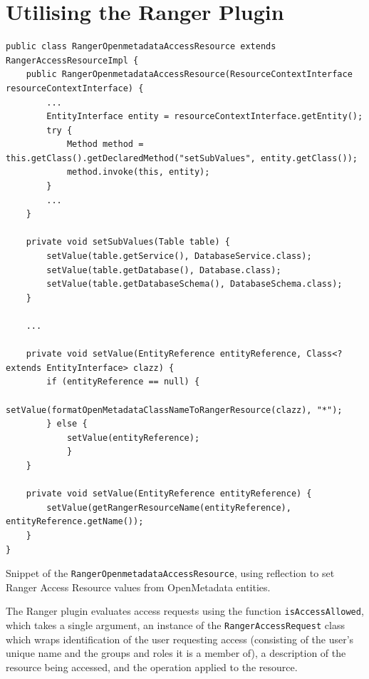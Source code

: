 \section{\label{sec:utilising_the_ranger_plugin} Utilising the Ranger Plugin}

\begin{listing}[htb!]

\begin{verbatim}
public class RangerOpenmetadataAccessResource extends RangerAccessResourceImpl {
    public RangerOpenmetadataAccessResource(ResourceContextInterface resourceContextInterface) {
        ...
        EntityInterface entity = resourceContextInterface.getEntity();
        try {
            Method method = this.getClass().getDeclaredMethod("setSubValues", entity.getClass());
            method.invoke(this, entity);
        } 
        ...
    }
    
    private void setSubValues(Table table) {
        setValue(table.getService(), DatabaseService.class);
        setValue(table.getDatabase(), Database.class);
        setValue(table.getDatabaseSchema(), DatabaseSchema.class);
    }
    
    ...

    private void setValue(EntityReference entityReference, Class<? extends EntityInterface> clazz) {
        if (entityReference == null) {
            setValue(formatOpenMetadataClassNameToRangerResource(clazz), "*");
        } else {
            setValue(entityReference);
            }
    }

    private void setValue(EntityReference entityReference) {
        setValue(getRangerResourceName(entityReference), entityReference.getName());
    }
}
\end{verbatim}

\caption{Snippet of the \texttt{RangerOpenmetadataAccessResource}, using reflection to set Ranger Access Resource values from OpenMetadata entities.}

\label{listing:ranger_openmetadta_access_resource}

\end{listing}

The Ranger plugin evaluates access requests using the function \texttt{isAccessAllowed}, which takes a single argument, an instance of the \texttt{RangerAccessRequest} class which wraps identification of the user requesting access (consisting of the user's unique name and the groups and roles it is a member of), a description of the resource being accessed, and the operation applied to the resource. 

